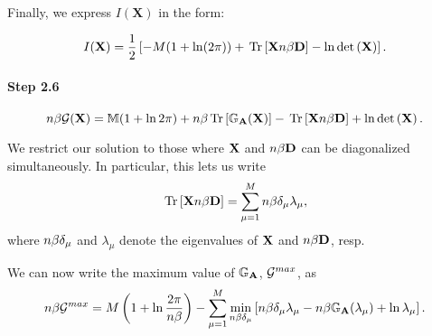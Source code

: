 Finally, we express $I(\mathbf{X})$ in the form:

\begin{equation}
I(\mathbf{X}) = \frac{1}{2} \left[ -M(1 + \ln(2\pi)) + \mbox{}\operatorname{Tr}\left[\mathbf{X}n\beta\mathbf{D}\right] - \ln \mbox{}{\text{det}}\left(\mathbf{X}\right) \right].
\end{equation}

\paragraph{Step 2.6}
\begin{equation}
  n\beta\mathcal{G}(\mathbf{X})=\mathbb{M}(1+\ln 2\pi)+n\beta\mbox{}\operatorname{Tr}\left[\mathbb{G}_{\mathbf{A}}(\mathbf{X})\right] - \mbox{}\operatorname{Tr}\left[\mathbf{X}n\beta\mathbf{D}\right] +  \ln \mbox{}{\text{det}}\left(\mathbf{X}\right).
\end{equation}

We restrict our solution to those where $\mathbf{X}$ and $n\beta\mathbf{D}$ can be diagonalized simultaneously.
In particular, this lets us write
\begin{equation}
\mbox{}\operatorname{Tr}\left[\mathbf{X}n\beta\mathbf{D}\right] = \sum_{\mu=1}^{M}n\beta\delta_{\mu}\lambda_{\mu}   ,
\end{equation}
where $n\beta\delta_{\mu}$ and $\lambda_{\mu}$ denote the eigenvalues of $\mathbf{X}$ and $n\beta\mathbf{D}$, resp.

We can now write the maximum value of $\mathbb{G}_{\mathbf{A}}$, $\mathcal{G}^{max}$, as
\begin{equation}
\label{eqn:gmax_final}
n\beta\mathcal{G}^{max} = M \left( 1 + \ln \frac{2\pi}{n\beta} \right) - \sum_{\mu=1}^{M} \min_{n\beta\delta_{\mu}} \left[n\beta\delta_{\mu}\lambda_{\mu}
- n\beta\mathbb{G}_{\mathbf{A}}(\lambda_{\mu}) + \ln \lambda_{\mu} \right]   .
\end{equation}
